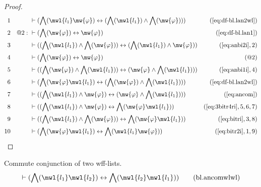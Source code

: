 \begin{proof}
\begin{align}
  1 &&  & \vdash ( \bigwedge( \mwl{l_1} \mw{\varphi} ) \leftrightarrow ( \bigwedge( \mwl{l_1} ) \wedge \bigwedge( \mw{\varphi} ) ) )&(\mbox{\ref{eq:df-bl.lan2wl}})\notag
  \\ 2 && @2:\  & \vdash ( \bigwedge( \mw{\varphi} ) \leftrightarrow \mw{\varphi} )&(\mbox{\ref{eq:df-bl.lan1}})\notag
  \\ 3 &&  & \vdash ( ( \bigwedge( \mwl{l_1} ) \wedge \bigwedge( \mw{\varphi} ) ) \leftrightarrow ( \bigwedge( \mwl{l_1} ) \wedge \mw{\varphi} ) )&(\mbox{\ref{eq:anbi2i}},2)\notag
  \\ 4 &&  & \vdash ( \bigwedge( \mw{\varphi} ) \leftrightarrow \mw{\varphi} )&(@2)\notag
  \\ 5 &&  & \vdash ( ( \bigwedge( \mw{\varphi} ) \wedge \bigwedge( \mwl{l_1} ) ) \leftrightarrow ( \mw{\varphi} \wedge \bigwedge( \mwl{l_1} ) ) )&(\mbox{\ref{eq:anbi1i}},4)\notag
  \\ 6 &&  & \vdash ( \bigwedge( \mw{\varphi} \mwl{l_1} ) \leftrightarrow ( \bigwedge( \mw{\varphi} ) \wedge \bigwedge( \mwl{l_1} ) ) )&(\mbox{\ref{eq:df-bl.lan2wl}})\notag
  \\ 7 &&  & \vdash ( ( \bigwedge( \mwl{l_1} ) \wedge \mw{\varphi} ) \leftrightarrow ( \mw{\varphi} \wedge \bigwedge( \mwl{l_1} ) ) )&(\mbox{\ref{eq:ancom}})\notag
  \\ 8 &&  & \vdash ( ( \bigwedge( \mwl{l_1} ) \wedge \mw{\varphi} ) \leftrightarrow \bigwedge( \mw{\varphi} \mwl{l_1} ) )&(\mbox{\ref{eq:3bitr4ri}},5,6,7)\notag
  \\ 9 &&  & \vdash ( ( \bigwedge( \mwl{l_1} ) \wedge \bigwedge( \mw{\varphi} ) ) \leftrightarrow \bigwedge( \mw{\varphi} \mwl{l_1} ) )&(\mbox{\ref{eq:bitri}},3,8)\notag
  \\ 10 &&  & \vdash ( \bigwedge( \mw{\varphi} \mwl{l_1} ) \leftrightarrow \bigwedge( \mwl{l_1} \mw{\varphi} ) )&(\mbox{\ref{eq:bitr2i}},1,9)\notag
\end{align}
\end{proof}

\begin{lemma} Commute conjunction of two wff-lists.
\begin{align}
\vdash ( \bigwedge( \mwl{l_1} \mwl{l_2} ) \leftrightarrow \bigwedge( \mwl{l_2}
    \mwl{l_1} ) )\label{eq:bl.ancomwlwl}\tag{bl.ancomwlwl}
\end{align}
\end{lemma}

